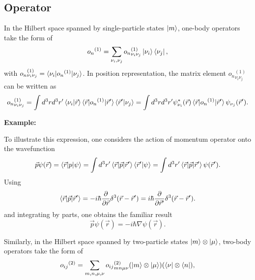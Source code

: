 \documentclass[a4paper,12pts]{article}
\numberwithin{equation}{section}
\begin{document}
	\subsection{Operator}
	In the Hilbert space spanned by single-particle states $\ket{m}$, one-body operators take the form of
	\begin{equation}
	{o_{n}}^{(1)} = \sum_{\nu_i,\nu_j}{o_{n}}^{(1)}_{\nu_i\nu_j}\ket{\nu_i}\bra{\nu_j},
	\end{equation}
	with ${o_{n}}^{(1)}_{\nu_i\nu_j} = \braket{\nu_i|{o_{n}}^{(1)}|\nu_j}$. In position representation, the matrix element ${o_{n}}^{(1)}_{\nu_i\nu_j}$ can be written as
	\begin{equation}
	{o_{n}}^{(1)}_{\nu_i\nu_j} = \int d^3rd^3r'\braket{\nu_i|\vec{r}}\braket{\vec{r}|{o_{n}}^{(1)}|\vec{r}'}\braket{\vec{r}'|\nu_j} = \int d^3rd^3r'\psi_{\nu_i}^*(\vec{r})\braket{\vec{r}|{o_{n}}^{(1)}|\vec{r}'}\psi_{\nu_j}(\vec{r}').
	\end{equation}
	\begin{mdframed}[backgroundcolor=gray!16]
		\textbf{Example:}\begin{center}
			\begin{minipage}{38em}
				To illustrate this expression, one considers the action of momentum operator onto the wavefunction
				\begin{equation}
				\vec{p}\psi(\vec{r}) = \braket{\vec{r}|p|\psi} = \int d^3r'\braket{\vec{r}|\vec{p}|\vec{r}'}\braket{\vec{r}'|\psi} = \int d^3r'\braket{\vec{r}|\vec{p}|\vec{r}'}\psi(\vec{r}').
				\end{equation}
				Using
				\begin{equation}
				\braket{\vec{r}|\vec{p}|\vec{r}'} = -i\hbar\frac{\partial}{\partial\vec{r}}\delta^3(\vec{r}-\vec{r}') = i\hbar\frac{\partial}{\partial\vec{r}'}\delta^3(\vec{r}-\vec{r}').
				\end{equation}
				and integrating by parts, one obtains the familiar result
				\begin{equation}
				\vec{p}\psi(\vec{r}) = -i\hbar\nabla\psi(\vec{r}).
				\end{equation}
			\end{minipage}
		\end{center}
	\end{mdframed}
	Similarly, in the Hilbert space spanned by two-particle states $\ket{m}\otimes\ket{\mu}$, two-body operators take the form of
	\begin{equation}
	{o_{ij}}^{(2)} = \sum_{m,n,\mu,\nu}{o_{ij}}^{(2)}_{mn\mu\nu}(\ket{m}\otimes\ket{\mu})(\bra{\nu}\otimes\bra{n}),
	\end{equation}
\end{document}
